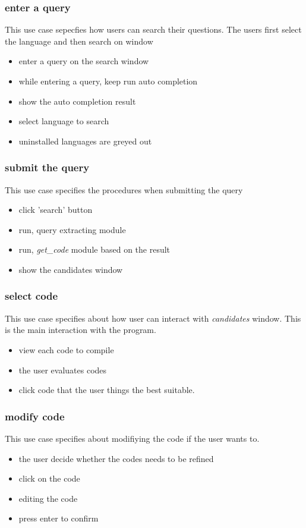 \documentclass[conference]{IEEEtran}
\begin{document}
\subsubsection{enter a query}
This use case sepecfies how users can search their questions. The users first select the language and then search on window
\begin{itemize}
  \item enter a query on the search window
  \item while entering a query, keep run auto completion
  \item show the auto completion result
  \item select language to search
  \item uninstalled languages are greyed out
\end{itemize}
\textit{}



\subsubsection{submit the query}
This use case specifies the procedures when submitting the query
\begin{itemize}
  \item click 'search' button
  \item run, query extracting module
  \item run, \textit{get\_code} module based on the result
  \item show the candidates window
\end{itemize}
\textit{}


\subsubsection{select code}
This use case specifies about how user can interact with \textit{candidates} window. This is the main interaction with the program.
\begin{itemize}
  \item view each code to compile
  \item the user evaluates codes
  \item click code that the user things the best suitable.
\end{itemize}
\textit{}



\subsubsection{modify code}
This use case specifies about modifiying the code if the user wants to.
\begin{itemize}
  \item the user decide whether the codes needs to be refined
  \item click on the code
  \item editing the code
  \item press enter to confirm
\end{itemize}
\textit{}
\end{document}
